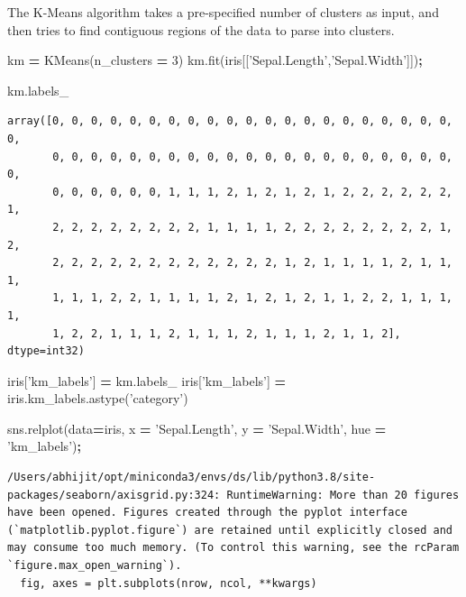 \documentclass[
  letterpaper,
]{scrbook}
\newenvironment{Shaded}{\begin{snugshade}}{\end{snugshade}}
\newcommand{\DecValTok}[1]{\textcolor[rgb]{0.00,0.00,0.81}{#1}}
\newcommand{\NormalTok}[1]{#1}
\newcommand{\OperatorTok}[1]{\textcolor[rgb]{0.81,0.36,0.00}{\textbf{#1}}}
\newcommand{\StringTok}[1]{\textcolor[rgb]{0.31,0.60,0.02}{#1}}
\begin{document}
The K-Means algorithm takes a pre-specified number of clusters as input, and then tries to find contiguous regions of the data to parse into clusters.

\begin{Shaded}
\begin{Highlighting}[]
\NormalTok{km }\OperatorTok{=}\NormalTok{ KMeans(n_clusters }\OperatorTok{=} \DecValTok{3}\NormalTok{)}
\NormalTok{km.fit(iris[[}\StringTok{'Sepal.Length'}\NormalTok{,}\StringTok{'Sepal.Width'}\NormalTok{]])}\OperatorTok{;}
\end{Highlighting}
\end{Shaded}

\begin{Shaded}
\begin{Highlighting}[]
\NormalTok{km.labels_}
\end{Highlighting}
\end{Shaded}

\begin{verbatim}
array([0, 0, 0, 0, 0, 0, 0, 0, 0, 0, 0, 0, 0, 0, 0, 0, 0, 0, 0, 0, 0, 0,
       0, 0, 0, 0, 0, 0, 0, 0, 0, 0, 0, 0, 0, 0, 0, 0, 0, 0, 0, 0, 0, 0,
       0, 0, 0, 0, 0, 0, 1, 1, 1, 2, 1, 2, 1, 2, 1, 2, 2, 2, 2, 2, 2, 1,
       2, 2, 2, 2, 2, 2, 2, 2, 1, 1, 1, 1, 2, 2, 2, 2, 2, 2, 2, 2, 1, 2,
       2, 2, 2, 2, 2, 2, 2, 2, 2, 2, 2, 2, 1, 2, 1, 1, 1, 1, 2, 1, 1, 1,
       1, 1, 1, 2, 2, 1, 1, 1, 1, 2, 1, 2, 1, 2, 1, 1, 2, 2, 1, 1, 1, 1,
       1, 2, 2, 1, 1, 1, 2, 1, 1, 1, 2, 1, 1, 1, 2, 1, 1, 2], dtype=int32)
\end{verbatim}

\begin{Shaded}
\begin{Highlighting}[]
\NormalTok{iris[}\StringTok{'km_labels'}\NormalTok{] }\OperatorTok{=}\NormalTok{ km.labels_}
\NormalTok{iris[}\StringTok{'km_labels'}\NormalTok{] }\OperatorTok{=}\NormalTok{ iris.km_labels.astype(}\StringTok{'category'}\NormalTok{)}

\NormalTok{sns.relplot(data}\OperatorTok{=}\NormalTok{iris, x }\OperatorTok{=} \StringTok{'Sepal.Length'}\NormalTok{, y }\OperatorTok{=} \StringTok{'Sepal.Width'}\NormalTok{, }
\NormalTok{           hue }\OperatorTok{=} \StringTok{'km_labels'}\NormalTok{)}\OperatorTok{;}
\end{Highlighting}
\end{Shaded}

\begin{verbatim}
/Users/abhijit/opt/miniconda3/envs/ds/lib/python3.8/site-packages/seaborn/axisgrid.py:324: RuntimeWarning: More than 20 figures have been opened. Figures created through the pyplot interface (`matplotlib.pyplot.figure`) are retained until explicitly closed and may consume too much memory. (To control this warning, see the rcParam `figure.max_open_warning`).
  fig, axes = plt.subplots(nrow, ncol, **kwargs)
\end{verbatim}
\end{document}

